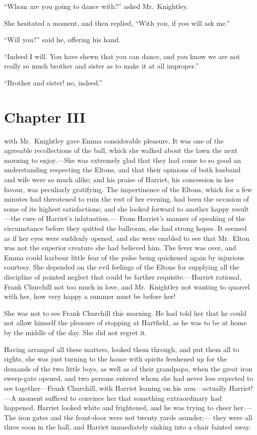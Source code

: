 ``Whom are you going to dance with?'' asked Mr.\ Knightley.

She hesitated a moment, and then replied, ``With you, if you will
ask me.''

``Will you?'' said he, offering his hand.

``Indeed I will.  You have shewn that you can dance, and you know we
are not really so much brother and sister as to make it at all improper.''

``Brother and sister! no, indeed.''



\chapter{Chapter III}


 with Mr.\ Knightley gave Emma considerable
pleasure.  It was one of the agreeable recollections of the ball,
which she walked about the lawn the next morning to enjoy.---She was
extremely glad that they had come to so good an understanding respecting
the Eltons, and that their opinions of both husband and wife were so
much alike; and his praise of Harriet, his concession in her favour,
was peculiarly gratifying.  The impertinence of the Eltons, which for
a few minutes had threatened to ruin the rest of her evening, had been
the occasion of some of its highest satisfactions; and she looked
forward to another happy result---the cure of Harriet's infatuation.---%
From Harriet's manner of speaking of the circumstance before they
quitted the ballroom, she had strong hopes.  It seemed as if her eyes
were suddenly opened, and she were enabled to see that Mr.\ Elton
was not the superior creature she had believed him.  The fever
was over, and Emma could harbour little fear of the pulse being
quickened again by injurious courtesy.  She depended on the evil
feelings of the Eltons for supplying all the discipline of pointed
neglect that could be farther requisite.---Harriet rational,
Frank Churchill not too much in love, and Mr.\ Knightley not
wanting to quarrel with her, how very happy a summer must be before her!

She was not to see Frank Churchill this morning.  He had told
her that he could not allow himself the pleasure of stopping
at Hartfield, as he was to be at home by the middle of the day.
She did not regret it.

Having arranged all these matters, looked them through, and put them all
to rights, she was just turning to the house with spirits freshened up
for the demands of the two little boys, as well as of their grandpapa,
when the great iron sweep-gate opened, and two persons entered
whom she had never less expected to see together---Frank Churchill,
with Harriet leaning on his arm---actually Harriet!---A moment
sufficed to convince her that something extraordinary had happened.
Harriet looked white and frightened, and he was trying to cheer her.---%
The iron gates and the front-door were not twenty yards asunder;---%
they were all three soon in the hall, and Harriet immediately sinking
into a chair fainted away.


